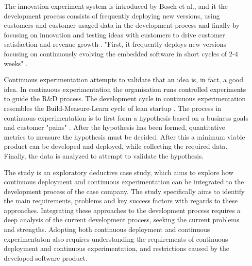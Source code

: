 \documentclass[english]{tktltiki2}
\theoremstyle{definition}
\theoremstyle{remark}
\begin{document}

The innovation experiment system is introduced by Bosch et al., and it the development process consists of frequently deploying new versions, using customers and customer usaged data in the development process and finally by focusing on innovation and testing ideas with customers to drive customer satisfaction and revenue growth \cite{bosch2012building}. "First, it frequently deploys new versions focusing on continuously evolving the embedded software in short cycles of 2-4 weeks" \cite{eklund2012architecture}.

Continuous experimentation attempts to validate that an idea is, in fact, a good idea. In continuous experimentation the organisation runs controlled experiments to guide the R\&D process. The development cycle in continuous experimentation resembles the Build-Measure-Learn cycle of lean startup \cite{ries2011lean}. The process in continuous experimentation is to first form a hypothesis based on a business goals and customer "pains" \cite{bosch2012building}. After the hypothesis has been formed, quantitative metrics to measure the hypothesis must be decided. After this a minimum viable product can be developed and deployed, while collecting the required data. Finally, the data is analyzed to attempt to validate the hypothesis.



The study is an exploratory deductive case study, which aims to explore how continuous deployment and continuous experimentation can be integrated to the development process of the case company. The study specifically aims to identify the main requirements, problems and key success factors with regards to these approaches. Integrating these approaches to the development process requires a deep analysis of the current development process, seeking the current problems and strengths. Adopting both continuous deployment and continuous experimentaton also requires understanding the requirements of continuous deployment and continuous experimentation, and restrictions caused by the developed software product.
\end{document}
